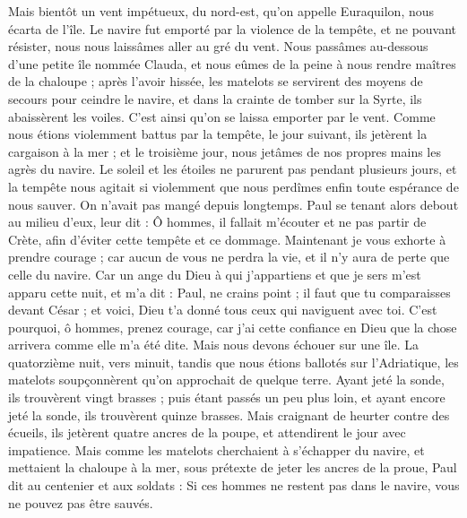 \begin{multicols}{2}
Mais bientôt un vent impétueux, du nord-est, qu'on appelle Euraquilon, nous écarta de l'île.
Le navire fut emporté par la violence de la tempête, et ne pouvant résister, nous nous laissâmes aller au gré du vent.
Nous passâmes au-dessous d'une petite île nommée Clauda, et nous eûmes de la peine à nous rendre maîtres de la chaloupe ;
après l'avoir hissée, les matelots se servirent des moyens de secours pour ceindre le navire, et dans la crainte de tomber sur la Syrte, ils abaissèrent les voiles. C'est ainsi qu'on se laissa emporter par le vent.
Comme nous étions violemment battus par la tempête, le jour suivant, ils jetèrent la cargaison à la mer ;
et le troisième jour, nous jetâmes de nos propres mains les agrès du navire.
Le soleil et les étoiles ne parurent pas pendant plusieurs jours, et la tempête nous agitait si violemment que nous perdîmes enfin toute espérance de nous sauver.
On n'avait pas mangé depuis longtemps. Paul se tenant alors debout au milieu d'eux, leur dit : Ô hommes, il fallait m'écouter et ne pas partir de Crète, afin d'éviter cette tempête et ce dommage.
Maintenant je vous exhorte à prendre courage ; car aucun de vous ne perdra la vie, et il n'y aura de perte que celle du navire.
Car un ange du Dieu à qui j'appartiens et que je sers m'est apparu cette nuit,
et m'a dit : Paul, ne crains point ; il faut que tu comparaisses devant César ; et voici, Dieu t'a donné tous ceux qui naviguent avec toi.
C'est pourquoi, ô hommes, prenez courage, car j'ai cette confiance en Dieu que la chose arrivera comme elle m'a été dite.
Mais nous devons échouer sur une île.
La quatorzième nuit, vers minuit, tandis que nous étions ballotés sur l'Adriatique, les matelots soupçonnèrent qu'on approchait de quelque terre.
Ayant jeté la sonde, ils trouvèrent vingt brasses ; puis étant passés un peu plus loin, et ayant encore jeté la sonde, ils trouvèrent quinze brasses.
Mais craignant de heurter contre des écueils, ils jetèrent quatre ancres de la poupe, et attendirent le jour avec impatience.
Mais comme les matelots cherchaient à s'échapper du navire, et mettaient la chaloupe à la mer, sous prétexte de jeter les ancres de la proue,
Paul dit au centenier et aux soldats : Si ces hommes ne restent pas dans le navire, vous ne pouvez pas être sauvés.

\end{multicols}

